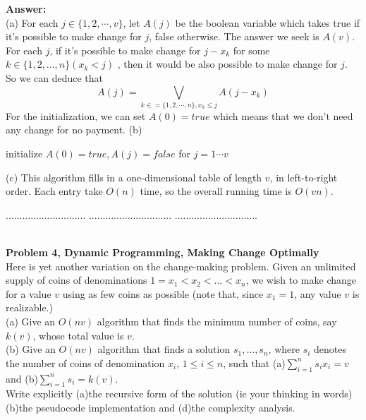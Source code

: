 \documentclass{article}
\begin{document}
\noindent
{\bf Answer:}\\


\noindent(a) For each $j\in\{1,2,\cdots,v\}$, let $A(j)$ be the boolean variable which takes true if it's possible to make change for $j$, false otherwise. 
The answer we seek is $A(v)$. 
For each $j$, if it's possible to make change for $j-x_k$ for some $k\in\{1,2,...,n\}(x_k<j)$ , then it would be also possible to make change for $j$.
 So we can deduce that 
\[ 
A(j)=\bigvee_{k\in=\{1,2,\cdots,n\},x_k\leq j} A(j-x_k) 
\]
For the initialization, we can set $A(0)=true$ which means that we don't need any change for no payment.
\noindent(b) \\
\begin{algorithm}[H]
	initialize $A(0) = true, A(j)=false$ for $j=1\cdots v$ \\
\end{algorithm} 

\noindent(c)
This algorithm fills in a one-dimensional table of length $v$, in left-to-right order. Each entry take $O(n)$ time, so the overall running time is $O(vn)$.


\pagebreak
\noindent{\bf  } $.............................$
\noindent{\bf } $..............................$
\noindent{\bf }          $..............................$

\noindent
{}\\

\noindent
{\bf Problem 4, Dynamic Programming, Making Change Optimally }\\
Here is yet another variation on the change-making problem.
Given an unlimited supply of coins of denominations $1=x_1 < x_2 < \ldots < x_n$, we wish to make change for
a value $ v$ using as few coins as possible (note that, since $x_1=1$, any value $v$ is realizable.) \\
(a) Give an $O(nv)$ algorithm that finds the minimum number of coins, say $k(v)$, whose total value is $v$.\\
(b) Give an $O(nv)$ algorithm that finds a solution $s_1, \ldots , s_n$, where $s_i$ denotes the number of coins
of denomination $x_i$, $1 \leq i \leq n$, such that (a)$\sum_{i=1}^n s_i x_i = v$ and 
(b)$\sum_{i=1}^n s_i  = k(v)$.\\
Write explicitly (a)the recursive form of the solution (ie your thinking in words) (b)the pseudocode implementation and 
(d)the complexity analysis. \\
\end{document}
